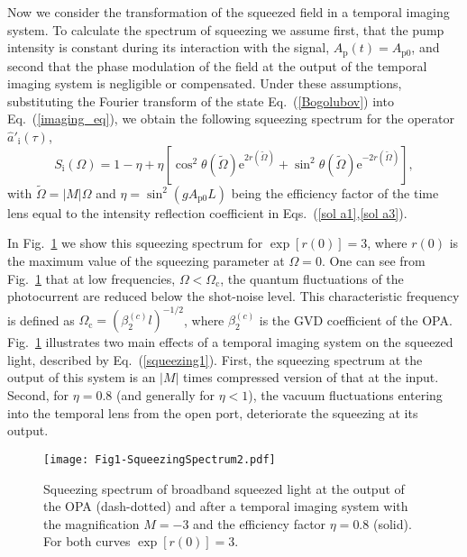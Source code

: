 \documentclass[10pt,twocolumn]{article}
\begin{document}
{%
Now we consider the transformation of the squeezed field in a temporal imaging system.} To calculate the spectrum of squeezing we assume first, that the pump intensity is constant during its interaction with the signal, $A_{\mathrm{p}}(t)=A_{\mathrm{p0}}$, and second that the phase modulation of the field at the output of the temporal imaging system is negligible or compensated. Under these assumptions,
{%
substituting the Fourier transform of the state Eq.~(\ref{Bogolubov}) into Eq.~(\ref{imaging_eq}), we obtain the following squeezing spectrum for the operator $\hat{a}'_{\mathrm{i}}(\tau)$},
%
\begin{equation}
     S_{\mathrm{i}}(\Omega)=1-\eta+\eta[\cos^2\theta(\tilde\Omega)\mathrm{e}^{2r(\tilde\Omega)}+
     \sin^2\theta(\tilde\Omega)\mathrm{e}^{-2r(\tilde\Omega)}], \label{squeezing1}
\end{equation}
%
with $\tilde\Omega = |M|\Omega$ and $\eta=\sin^2(gA_{\mathrm{p0}}L)$ being the efficiency factor of the time lens equal to the intensity reflection coefficient in Eqs.~(\ref{sol a1},\ref{sol a3}).

In Fig.~\ref{fig:Spectrum} we show this squeezing spectrum for $\exp[r(0)]=3$, where $r(0)$ is the maximum value of the squeezing parameter at $\Omega=0$. One can see from Fig.~\ref{fig:Spectrum} that at low frequencies, $\Omega<\Omega_{\mathrm{c}}$, the quantum fluctuations of the photocurrent are reduced below the shot-noise level. This characteristic frequency is defined as $\Omega_{\mathrm{c}}=(\beta^{(c)}_{\mathrm{2}}l)^{-1/2}$, where $\beta^{(c)}_{\mathrm{2}}$ is the GVD coefficient of the OPA. Fig.~\ref{fig:Spectrum} illustrates two main effects of a temporal imaging system on the squeezed light, described by Eq.~(\ref{squeezing1}). First, the squeezing spectrum at the output of this system is an $|M|$ times compressed version of that at the input. Second, for $\eta=0.8$ (and generally for $\eta<1$), the vacuum fluctuations entering into the temporal lens from the open port, deteriorate the squeezing at its output.
%

\begin{figure}[t!]
\centering
\texttt{[image: Fig1-SqueezingSpectrum2.pdf]}
\caption{Squeezing spectrum of broadband squeezed light at the output of the OPA (dash-dotted) and after a temporal imaging system with the magnification $M=-3$ and the efficiency factor $\eta=0.8$ (solid). For both curves $\exp[ r(0)] = 3$.}
\label{fig:Spectrum}
\end{figure}
\end{document}
